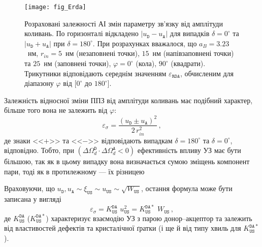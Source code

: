 \begin{figure}
\center
\texttt{[image: fig\_Erda]}
\caption{\label{fig_Erda}
Розраховані залежності АІ змін параметру зв'язку від амплітуди коливань.
По горизонталі відкладено $|u_\mathtt{D}-u_\mathtt{A}|$ для випадків $\delta=0^\circ$ та
$|u_\mathtt{D}+u_\mathtt{A}|$ при $\delta=180^\circ$.
При розрахунках вважалося, що
$a_B=3.23$~нм,
$r_{in}=5$~нм (незаповнені точки), $15$~нм (напівзаповнені точки) та $25$~нм (заповнені точки),
$\varphi=0^\circ$ (кола), $90^\circ$ (квадрати).
Трикутники відповідають середнім значенням $\varepsilon_{\mathtt{RDA}}$,
обчисленим для діапазону $\varphi$ від $[0^\circ$ до $180^\circ]$.
}%
\end{figure}

Залежність відносної зміни ППЗ від амплітуди коливань має подібний характер, більше того
вона не залежить від $\varphi$:
\begin{equation}
\label{eqEpsSig}
\varepsilon_{\sigma}=\frac{(u_\mathtt{D}\pm u_\mathtt{A})^2}{2\,r_{in}^2}\,,
\end{equation}
де
знаки <<$+$>> та <<$-$>> відповідають випадкам $\delta=180^\circ$ та $\delta=0^\circ$, відповідно.
Тобто, при $(\Delta\Omega_d^\mathtt{D}\cdot\Delta\Omega_d^\mathtt{A}<0)$ ефективність впливу УЗ має бути більшою,
так як в цьому випадку вона визначається сумою зміщень компонент пари,
тоді як в протилежному --- їх різницею


Враховуючи, що $u_\mathtt{D},u_\mathtt{A}\sim \xi_\mathtt{US}\sim u_\mathtt{US}\sim \sqrt{W_\mathtt{US}}$,
остання формула може бути записана у вигляді
\begin{equation}
\label{eqEpsSigUS}
\varepsilon_{\sigma}=K_\mathtt{US}^\mathtt{DA}\,\,u_{\mathtt{US}}^2=K_\mathtt{US}^\mathtt{DA*}\,\,W_{\mathtt{US}}\,,
\end{equation}
де $K_\mathtt{US}^\mathtt{DA}$ ($K_\mathtt{US}^\mathtt{DA*}$) характеризує взаємодію УЗ з парою донор--акцептор
та залежить від властивостей дефектів та кристалічної ґратки (і ще й від типу хвиль для $K_\mathtt{US}^\mathtt{DA*}$).

